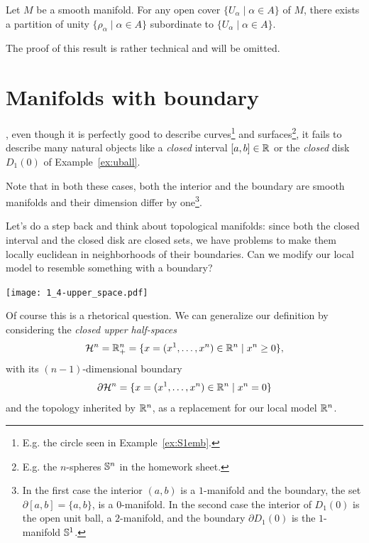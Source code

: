 \begin{thm}
  Let $M$ be a smooth manifold. For any open cover $\{U_\alpha\mid\alpha\in A\}$ of $M$, there exists a partition of unity $\{\rho_\alpha \mid \alpha\in A\}$ subordinate to $\{U_\alpha\mid\alpha\in A\}$.
\end{thm}

The proof of this result is rather technical and will be omitted.

\section{Manifolds with boundary}\label{sec:mbnd}

, even though it is perfectly good to describe curves\footnote{E.g. the circle seen in Example~\ref{ex:S1emb}.} and surfaces\footnote{E.g. the $n$-spheres $\mathbb{S}^n$ in the homework sheet.}, it fails to describe many natural objects like a \emph{closed} interval $[a,b]\in\mathbb{R}$ or the \emph{closed} disk $D_1(0)$ of Example~\ref{ex:uball}.

Note that in both these cases, both the interior and the boundary are smooth manifolds and their dimension differ by one\footnote{In the first case the interior $(a,b)$ is a $1$-manifold and the boundary, the set $\partial[a,b] = \{a,b\}$, is a $0$-manifold. In the second case the interior of $D_1(0)$ is the open unit ball, a $2$-manifold, and the boundary $\partial D_1(0)$ is the $1$-manifold $\mathbb{S}^1$.}.

Let's do a step back and think about topological manifolds: since both the closed interval and the closed disk are closed sets, we have problems to make them locally euclidean in neighborhoods of their boundaries.
Can we modify our local model to resemble something with a boundary?

\begin{marginfigure}
  \texttt{[image: 1\_4-upper\_space.pdf]}
\end{marginfigure}
Of course this is a rhetorical question.
We can generalize our definition by considering the \emph{closed upper half-spaces}
\begin{equation}
  \mathcal{H}^n = \mathbb{R}_+^n = \{x=(x^1, \ldots, x^n)\in\mathbb{R}^n\mid x^n \geq 0\},
\end{equation}
with its $(n-1)$-dimensional boundary
\begin{equation}
  \partial\mathcal{H}^n = \{x=(x^1, \ldots, x^n)\in\mathbb{R}^n\mid x^n = 0\}
\end{equation}
and the topology inherited by $\mathbb{R}^n$, as a replacement for our local model $\mathbb{R}^n$.

